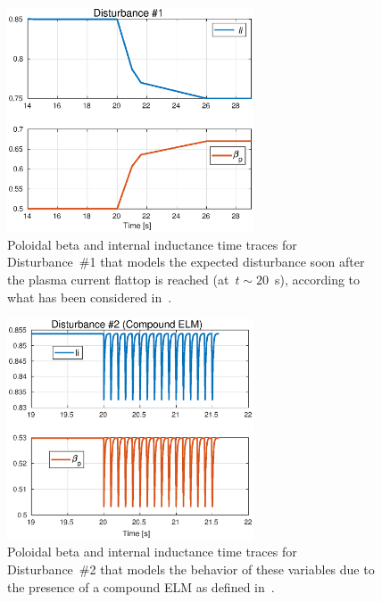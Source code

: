 	\begin{figure}[h]
	\centering
	\includegraphics[width=0.65\textwidth]{Chp3/Dist_1_Urano.eps}
	\caption{Poloidal beta and internal inductance time traces for Disturbance~\#1 that models the expected disturbance soon after the plasma current flattop is reached (at~$t\sim 20 $~s), according to what has been considered in~\cite{urano2015development}.	\label{Urano} }
\end{figure}

	\begin{figure}[h]
	\centering
	\includegraphics[width=0.65\textwidth]{Chp3/Dist_2_cmp_ELM.eps}
	\caption{Poloidal beta and internal inductance time traces for Disturbance~\#2 that models the behavior of these variables due to the presence of a compound ELM as defined in~\cite{JT60SA:PID}.	\label{cmpELM} }
\end{figure}


